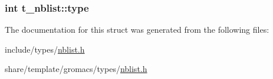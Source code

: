 \hypertarget{structt__nblist_adef3366dba11683e13b96a4bd9517852}{
\subsubsection[{type}]{\setlength{\rightskip}{0pt plus 5cm}int {\bf t\-\_\-nblist\-::type}}}\label{structt__nblist_adef3366dba11683e13b96a4bd9517852}


\-The documentation for this struct was generated from the following files\-:\begin{DoxyCompactItemize}
\item 
include/types/\hyperlink{include_2types_2nblist_8h}{nblist.\-h}\item 
share/template/gromacs/types/\hyperlink{share_2template_2gromacs_2types_2nblist_8h}{nblist.\-h}\end{DoxyCompactItemize}

